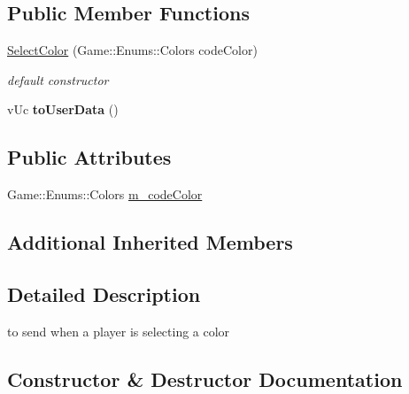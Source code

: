 \subsection*{Public Member Functions}
\begin{DoxyCompactItemize}
\item 
\hyperlink{class_network_1_1_messages_1_1_select_color_afef9117d91721e687d27460cc3a7e35c}{Select\+Color} (Game\+::\+Enums\+::\+Colors code\+Color)
\begin{DoxyCompactList}\small\item\em default constructor \end{DoxyCompactList}\item 
\mbox{\label{class_network_1_1_messages_1_1_select_color_a1f77d8e092d02c0d4a5fc413f874f3d9}} 
v\+Uc {\bfseries to\+User\+Data} ()
\end{DoxyCompactItemize}
\subsection*{Public Attributes}
\begin{DoxyCompactItemize}
\item 
Game\+::\+Enums\+::\+Colors \hyperlink{class_network_1_1_messages_1_1_select_color_abbc40bfe896ce4006ef7f1160a0a0605}{m\+\_\+code\+Color}
\end{DoxyCompactItemize}
\subsection*{Additional Inherited Members}


\subsection{Detailed Description}
to send when a player is selecting a color 

\subsection{Constructor \& Destructor Documentation}
\mbox{\label{class_network_1_1_messages_1_1_select_color_afef9117d91721e687d27460cc3a7e35c}} 
